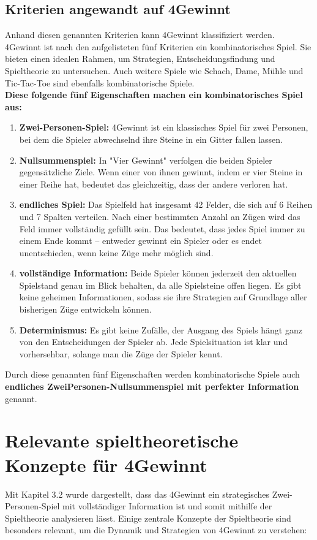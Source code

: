 \subsection*{Kriterien angewandt auf 4Gewinnt}
Anhand diesen genannten Kriterien kann 4Gewinnt klassifiziert werden. 4Gewinnt ist nach den aufgelisteten fünf Kriterien ein kombinatorisches Spiel. Sie bieten einen idealen Rahmen, um Strategien, Entscheidungsfindung und Spieltheorie zu untersuchen. Auch weitere Spiele wie Schach, Dame, Mühle und Tic-Tac-Toe sind ebenfalls kombinatorische Spiele. \\

\textbf{Diese folgende fünf Eigenschaften machen ein kombinatorisches Spiel aus:}
\begin{enumerate}
	\item   \textbf{Zwei-Personen-Spiel: }4Gewinnt ist ein klassisches Spiel für zwei Personen, bei dem die Spieler abwechselnd ihre Steine in ein Gitter fallen lassen. 
	\item 	\textbf{Nullsummenspiel: }In "Vier Gewinnt" verfolgen die beiden Spieler gegensätzliche Ziele. Wenn einer von ihnen gewinnt, indem er vier Steine in einer Reihe hat, bedeutet das gleichzeitig, dass der andere verloren hat.
	\item 	\textbf{endliches Spiel: } Das Spielfeld hat insgesamt 42 Felder, die sich auf 6 Reihen und 7 Spalten verteilen. Nach einer bestimmten Anzahl an Zügen wird das Feld immer vollständig gefüllt sein. Das bedeutet, dass jedes Spiel immer zu einem Ende kommt – entweder gewinnt ein Spieler oder es endet unentschieden, wenn keine Züge mehr möglich sind.
	\item 	\textbf{vollständige Information: } Beide Spieler können jederzeit den aktuellen Spielstand genau im Blick behalten, da alle Spielsteine offen liegen. Es gibt keine geheimen Informationen, sodass sie ihre Strategien auf Grundlage aller bisherigen Züge entwickeln können.
	\item 	\textbf{Determinismus:} Es gibt keine Zufälle, der Ausgang des Spiels hängt ganz von den Entscheidungen der Spieler ab. Jede Spielsituation ist klar und vorhersehbar, solange man die Züge der Spieler kennt.
\end{enumerate}

Durch diese genannten fünf Eigenschaften werden kombinatorische Spiele auch \textbf{endliches ZweiPersonen-Nullsummenspiel mit perfekter Information} genannt\autocite{holler_einfuhrung_2019}.

\section{Relevante spieltheoretische Konzepte für 4Gewinnt}
Mit Kapitel 3.2 wurde dargestellt, dass das 4Gewinnt ein strategisches Zwei-Personen-Spiel mit vollständiger Information ist und somit mithilfe der Spieltheorie analysieren lässt. Einige zentrale Konzepte der Spieltheorie sind besonders relevant, um die Dynamik und Strategien von 4Gewinnt zu verstehen:



